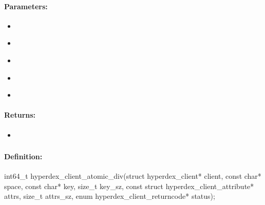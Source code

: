 \paragraph{Parameters:}
\begin{itemize}[noitemsep]
\item {}\\

\item {}\\

\item {}\\

\item {}\\

\item {}\\

\end{itemize}

\paragraph{Returns:}
\begin{itemize}[noitemsep]
\item {}\\

\end{itemize}

\pagebreak
\subsubsection{}
\label{api:c:atomic_div}


\paragraph{Definition:}
\begin{ccode}
int64_t hyperdex_client_atomic_div(struct hyperdex_client* client,
        const char* space,
        const char* key, size_t key_sz,
        const struct hyperdex_client_attribute* attrs, size_t attrs_sz,
        enum hyperdex_client_returncode* status);
\end{ccode}

